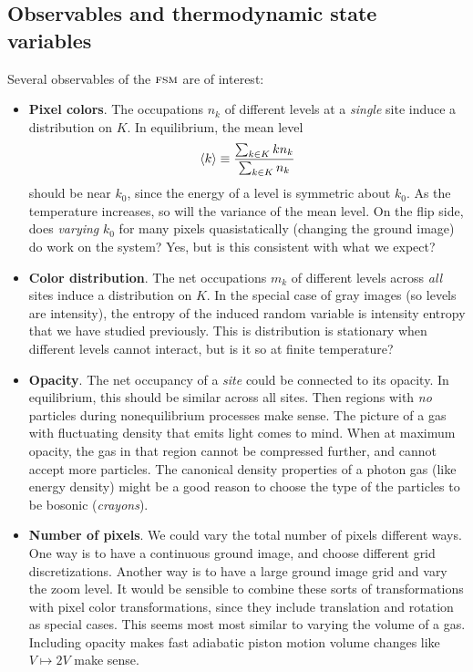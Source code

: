 \documentclass[../notebook.tex]{subfiles}
\begin{document}
\subsection{Observables and thermodynamic state variables}

Several observables of the $\textsc{fsm}$ are of interest:
\begin{itemize}
  \item \textbf{Pixel colors}. The occupations $n_k$ of different levels at a
    \emph{single} site induce a distribution on $K$. In equilibrium, the mean
    level
    \[
      \ev{k}
      \equiv \frac{\sum_{k \in K} k n_k}{\sum_{k \in K} n_k}
    \]
    should be near $k_0$, since the energy of a level is symmetric about $k_0$.
    As the temperature increases, so will the variance of the mean level. On the
    flip side, does \emph{varying} $k_0$ for many pixels quasistatically
    (changing the ground image) do work on the system? Yes, but is this
    consistent with what we expect?

  \item \textbf{Color distribution}. The net occupations $m_k$ of different
    levels across \emph{all} sites induce a distribution on $K$. In the special
    case of gray images (so levels are intensity), the entropy of the induced
    random variable is intensity entropy that we have studied previously. This
    is distribution is stationary when different levels cannot interact, but is
    it so at finite temperature?
    
  \item \textbf{Opacity}. The net occupancy of a \emph{site} could be connected
    to its opacity. In equilibrium, this should be similar across all sites.
    Then regions with \emph{no} particles during nonequilibrium processes make
    sense. The picture of a gas with fluctuating density that emits light comes
    to mind. When at maximum opacity, the gas in that region cannot be
    compressed further, and cannot accept more particles. The canonical density
    properties of a photon gas (like energy density) might be a good reason to
    choose the type of the particles to be bosonic (\emph{crayons}).

  \item \textbf{Number of pixels}. We could vary the total number of pixels
    different ways. One way is to have a continuous ground image, and choose
    different grid discretizations. Another way is to have a large ground image
    grid and vary the zoom level. It would be sensible to combine these sorts of
    transformations with pixel color transformations, since they include
    translation and rotation as special cases. This seems most most similar to
    varying the volume of a gas. Including opacity makes fast adiabatic piston
    motion volume changes like $V \mapsto 2V$ make sense.


\end{itemize}
\end{document}
